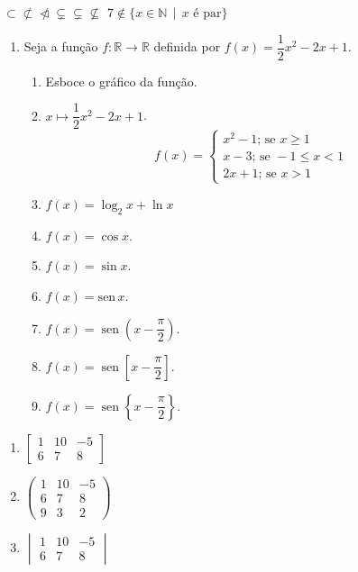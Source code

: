 \documentclass[a4paper,12pt]{article}
\DeclareMathOperator{\sen}{sen}
\begin{document}
   $\subset \not\subset \ntriangleleft \subsetneq \varsubsetneq\nsubseteq$ \newline $7 \not\in \{ x \in \mathbb{N} \, \mid \,x \textrm{ é par}\}$  
   \begin{enumerate}
      \item Seja a função $f:\mathbb{R} \to \mathbb{R}$ definida por $f(x)= \dfrac{1}{2}x^2-2x + 1$.
      \begin{enumerate}
         \item Esboce o gráfico da função.
         \item $x \mapsto \dfrac{1}{2}x^2-2x + 1$.
         $$f(x)=   
   \begin{cases}
      x^2 - 1; \,\textrm{se } x \geq 1\\
      x-3;\,\textrm{se }-1 \leq x < 1\\
      2x + 1; \,\textrm{se } x>1
   \end{cases}$$
         \item $f(x)= \log_2x + \ln x $
         \item $f(x) = \cos x$.
         \item $f(x) = \sin x$.
         \item $f(x) = \textrm{sen}\, x$.
         \item $f(x) = \sen \left( x- \dfrac{\pi}{2}\right)$.
         \item $f(x) = \sen \left[ x- \dfrac{\pi}{2}\right]$.
         
          \item $f(x) = \sen \left\{ x- \dfrac{\pi}{2}\right\}$.
      \end{enumerate}
   \end{enumerate}     
   \begin{enumerate}
    \item$\begin{bmatrix}
      1 & 10 & -5 \\
      6&7&8
   \end{bmatrix}$  
   \item $ \begin{pmatrix}
      1 & 10 & -5 \\
      6&7&8 \\ 9&3&2
      \end{pmatrix}$
      \item $\begin{vmatrix}
      1 & 10 & -5 \\
      6&7&8
      \end{vmatrix}$ 
   \end{enumerate}
\end{document}
